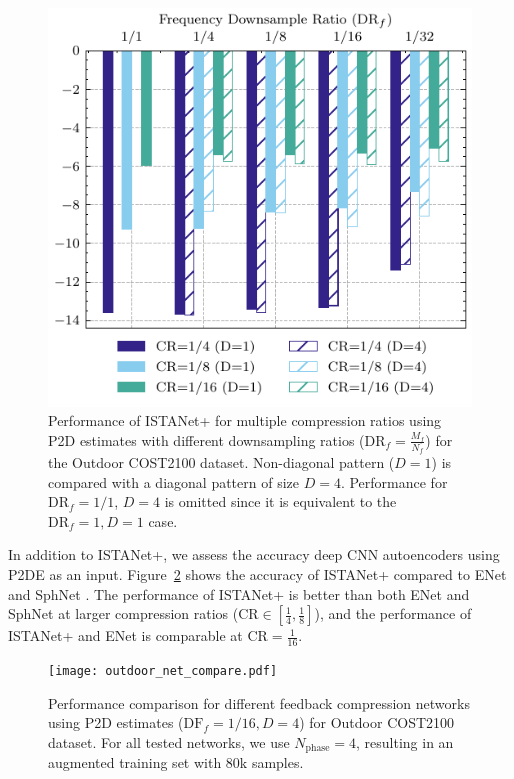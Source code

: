 \begin{figure}[!hbtp]
    \centering
    \includegraphics{./images/outdoor_drcr_D_sweep.pdf}
    \caption{Performance of ISTANet+ for multiple compression ratios using P2D estimates with different downsampling ratios ($\text{DR}_f=\frac{M_f}{N_f}$) for the Outdoor COST2100 dataset. Non-diagonal pattern ($D=1$) is compared with a diagonal pattern of size $D=4$. Performance for $\text{DR}_f=1/1$, $D=4$ is omitted since it is equivalent to the $\text{DR}_f=1, D=1$ case.}
    \label{fig:outdoor_drcr_sweep}
\end{figure}

In addition to ISTANet+, we assess the accuracy deep CNN autoencoders using P2DE as an input. Figure~\ref{fig:outdoor_net_ablation} shows the accuracy of ISTANet+ compared to ENet \cite{ref:Sun2021ENet} and SphNet \cite{ref:liu2020sphnet}. The performance of ISTANet+ is better than both ENet and SphNet at larger compression ratios ($\text{CR}\in [\frac 14, \frac 18]$), and the performance of ISTANet+ and ENet is comparable at $\text{CR}=\frac {1}{16}$.

\begin{figure}[!hbtp]
    \centering
    \texttt{[image: outdoor\_net\_compare.pdf]}
    \caption{Performance comparison for different feedback compression networks using P2D estimates ($\text{DF}_f=1/16, D=4$) for Outdoor COST2100 dataset. For all tested networks, we use $N_{\text{phase}}=4$, resulting in an augmented training set with $80$k samples.}
    \label{fig:outdoor_net_ablation}
\end{figure}


